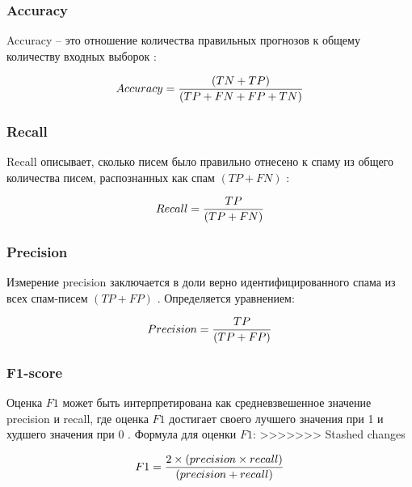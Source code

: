 \subsubsection{Accuracy}\label{Accuracy}

Accuracy -- это отношение количества правильных прогнозов к общему количеству входных
выборок \cite{scikitMetrics}:

\begin{equation}\label{eq11}
    Accuracy = {{(TN + TP)} \over{(TP + FN + FP + TN)}}
\end{equation}

\subsubsection{Recall}

Recall описывает, сколько писем было правильно отнесено к спаму из
общего количества писем, распознанных как спам $(TP + FN)$ \cite{scikitMetrics}:

\begin{equation}\label{eq12}
    Recall = {{TP} \over{(TP + FN)}}
\end{equation}

\subsubsection{Precision}

Измерение precision заключается в доли верно идентифицированного
спама из всех спам-писем $(TP + FP)$ \cite{scikitMetrics}. Определяется
уравнением:

\begin{equation}\label{eq13}
    Precision = {{TP} \over{(TP + FP)}}
\end{equation}

\subsubsection{F1-score}

Оценка $F1$ может быть интерпретирована как средневзвешенное
значение precision и recall, где оценка $F1$ достигает своего лучшего
значения при 1 и худшего значения при 0 \cite{scikitMetrics}.
Формула для оценки $F1$:
>>>>>>> Stashed changes

\begin{equation}\label{eq14}
    F1 = {2 \times (precision \times recall) \over{(precision + recall)}}
\end{equation}


